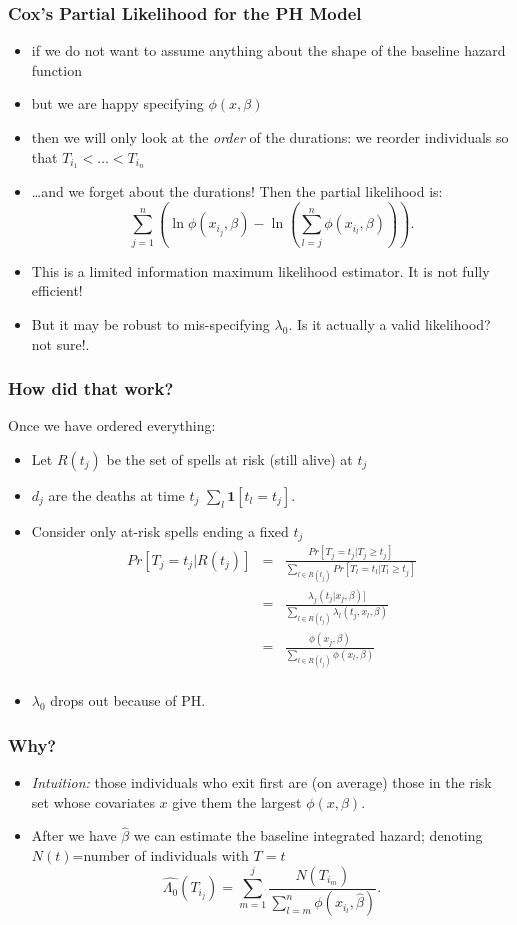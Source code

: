 \documentclass[xcolor=pdftex,dvipsnames,table,mathserif]{beamer}
\begin{document}
\begin{frame}
\frametitle{Cox's Partial Likelihood for the PH Model}
\begin{itemize}
\item if we do not want to assume anything about the shape of the \alert{baseline hazard function}
\item but we are happy specifying $\phi(x,\beta)$
\item then we will only look at the {\em order\/} of the durations: we
reorder individuals so that $T_{i_1}<\ldots<T_{i_n}$
\item \ldots and we forget about the durations! Then the partial
likelihood is:
\[
\sum_{j=1}^n
\left(
 \ln \phi(x_{i_j},\beta)
  -\ln
  \left(
  \sum_{l=j}^n
\phi(x_{i_l},\beta)
\right)
\right).
\]
\item This is a \alert{limited information maximum likelihood estimator}. It is not fully efficient!
\item But it may be robust to mis-specifying $\lambda_0$.  Is it actually a valid likelihood? \alert{not sure!}.
\end{itemize}
\end{frame}

\begin{frame}
\frametitle{How did that work?}
Once we have ordered everything:
\begin{itemize}
\item Let $R(t_j)$ be the set of spells at risk (still alive) at $t_j$
\item $d_j$ are the deaths at time $t_j$ $\sum_l \mathbf{1}[t_l = t_j]$.
\item Consider only at-risk spells ending a fixed $t_j$
\begin{eqnarray*}
Pr[T_j = t_j \vert R(t_j)] &=& \frac{Pr[T_j = t_j \vert T_j \geq t_j]}{\sum_{l \in R(t_j)} Pr[T_l = t_l \vert T_l \geq t_j]}\\
 &=& \frac{\lambda_j(t_j | x_j, \beta) ]}{\sum_{l \in R(t_j)} \lambda_l (t_j,x_l,\beta)}\\
 &=& \frac{\phi( x_j, \beta) }{\sum_{l \in R(t_j)} \phi (x_l,\beta)}\\
\end{eqnarray*}
\item $\lambda_0$ drops out because of PH.
\end{itemize}
\end{frame}

\begin{frame} 
\frametitle{Why?}
\begin{itemize}
\item \emph{Intuition:\/} those individuals who exit first are (on average) those in
the risk set whose covariates $x$ give them the largest $\phi(x,\beta)$.
\item After we have $\hat{\beta}$ we can estimate the baseline integrated
hazard; denoting $N(t)$=number of individuals with $T=t$
\[
\widehat{\Lambda_0}(T_{i_j})=\sum_{m=1}^j \frac{N(T_{i_m})}{\sum_{l=m}^n
\phi(x_{i_l},\hat{\beta})}.
\]
\end{itemize}
\end{frame}
\end{document}
